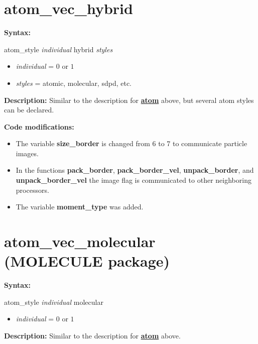 \section{atom\_vec\_hybrid}

{\bfseries Syntax:}

atom\_style \textit{individual} hybrid \textit{styles}
\begin{itemize}
\item \textit{individual} = $0$ or $1$
\item \textit{styles} = atomic, molecular, sdpd, etc.
\end{itemize}

{\bfseries Description:} Similar to the description for \hyperref[sec:atom]{\textbf{atom}} above, but several atom styles can be declared.
\vspace{0.2cm}

{\bfseries Code modifications:}
\begin{itemize}
\item The variable \textbf{size\_border} is changed from 6 to 7 to communicate particle images.
\item In the functions \textbf{pack\_border}, \textbf{pack\_border\_vel}, \textbf{unpack\_border}, and \textbf{unpack\_border\_vel} the image flag
  is communicated to other neighboring processors.
\item The variable \textbf{moment\_type} was added.
\end{itemize}  

\section{atom\_vec\_molecular (MOLECULE package)}

{\bfseries Syntax:}

atom\_style \textit{individual} molecular
\begin{itemize}
\item \textit{individual} = $0$ or $1$
\end{itemize}

{\bfseries Description:} Similar to the description for \hyperref[sec:atom]{\textbf{atom}} above.
\vspace{0.2cm}

